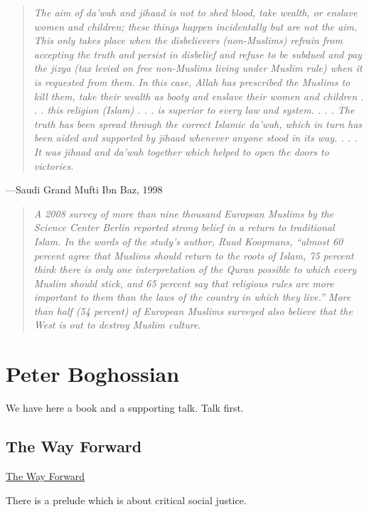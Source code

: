 \documentclass[10pt,titlepage]{book}
\begin{document}
\begin{quote}
{\it
The aim of da’wah and jihaad is not to shed blood, take wealth,
or enslave women and children; these things happen incidentally but are not the aim. This only takes place when the
disbelievers (non-Muslims) refrain from accepting the truth
and persist in disbelief and refuse to be subdued and pay the
jizya (tax levied on free non-Muslims living under Muslim
rule) when it is requested from them. In this case, Allah has
prescribed the Muslims to kill them, take their wealth as booty
and enslave their women and children . . . this religion (Islam)
. . . is superior to every law and system. . . . The truth has been
spread through the correct Islamic da’wah, which in turn has
been aided and supported by jihaad whenever anyone stood in
its way. . . . It was jihaad and da’wah together which helped to
open the doors to victories.
}
\end{quote}
—Saudi Grand Mufti Ibn Baz, 1998

\begin{quote}
{\it
A 2008 survey of more than nine thousand European Muslims
by the Science Center Berlin reported strong belief in a return
to traditional Islam. In the words of the study’s author, Ruud
Koopmans, “almost 60 percent agree that Muslims should return
to the roots of Islam, 75 percent think there is only one interpretation of the Quran possible to which every Muslim should stick,
and 65 percent say that religious rules are more important to
them than the laws of the country in which they live.” More than
half (54 percent) of European Muslims surveyed also believe
that the West is out to destroy Muslim culture.
}
\end{quote}

\section{Peter Boghossian}

We have here a book and a supporting talk.
Talk first.

\subsection{The Way Forward}

\href{https://www.youtube.com/watch?v=LiymUd9FjHA}{The Way Forward}

There is a prelude which is about critical social justice.
\end{document}
